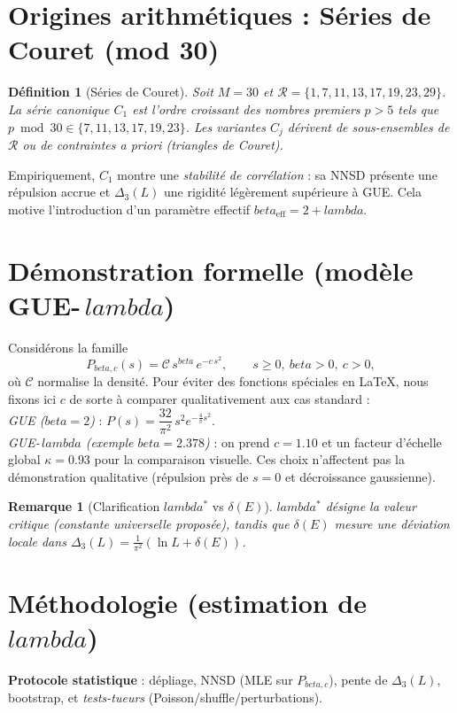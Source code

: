 \documentclass[11pt,a4paper]{article}
\def\lambda{lambda}%
\def\beta{beta}%
\newtheorem{definitionenv}{Définition}
\newtheorem{remarque}{Remarque}
\begin{document}
\section{Origines arithmétiques : Séries de Couret (mod 30)}
\begin{definitionenv}[Séries de Couret]
Soit $M=30$ et $\mathcal{R}=\{1,7,11,13,17,19,23,29\}$.
La série canonique $C_1$ est l’ordre croissant des nombres premiers $p>5$ tels que $p\bmod 30 \in \{7,11,13,17,19,23\}$.
Les variantes $C_j$ dérivent de sous-ensembles de $\mathcal{R}$ ou de contraintes \emph{a priori} (triangles de Couret).
\end{definitionenv}
Empiriquement, $C_1$ montre une \emph{stabilité de corrélation} : sa NNSD présente une répulsion accrue et $\Delta_3(L)$ une rigidité légèrement supérieure à GUE.
Cela motive l’introduction d’un paramètre effectif $\beta_{\text{eff}}=2+\lambda$.

\pagebreak%
\section{Démonstration formelle (modèle GUE-\texorpdfstring{\,$\lambda$}{lambda})}
Considérons la famille
\[ P_{\beta,c}(s)=\mathcal{C}\,s^{\beta}\,e^{-c\,s^2},\qquad s\ge 0,\ \beta>0,\ c>0, \]
où $\mathcal{C}$ normalise la densité. Pour éviter des fonctions spéciales en \LaTeX{}, nous fixons ici $c$ de sorte à comparer qualitativement aux cas standard :\\
\emph{GUE ($\beta=2$)} : $P(s)=\dfrac{32}{\pi^2}\,s^2 e^{-\tfrac{4}{\pi}s^2}$.\\
\emph{GUE-\,$\lambda$ (exemple $\beta=2{.}378$)} : on prend $c=1{.}10$ et un facteur d’échelle global $\kappa=0{.}93$ pour la comparaison visuelle.
Ces choix n’affectent pas la démonstration qualitative (répulsion près de $s=0$ et décroissance gaussienne).

\begin{remarque}[Clarification $\lambda^\ast$ vs $\delta(E)$]
$\lambda^\ast$ désigne la valeur critique (constante universelle proposée), tandis que $\delta(E)$ mesure une déviation \emph{locale} dans $\Delta_3(L)=\tfrac{1}{\pi^2}(\ln L+\delta(E))$.
\end{remarque}

\section{Méthodologie (estimation de \texorpdfstring{$\lambda$}{lambda})}
\textbf{Protocole statistique} : dépliage, NNSD (MLE sur $P_{\beta,c}$), pente de $\Delta_3(L)$, bootstrap, et \emph{tests-tueurs} (Poisson/shuffle/perturbations).
\end{document}
